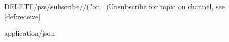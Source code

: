  
\begin{apiRoute}{DELETE}{/pss/subscribe//(?on=)}{Unsubscribe for topic on channel, see \ref{def:receive}}
{
}
{ }

\begin{routeParameter} 
\end{routeParameter}
\begin{queryParameter} 
\end{queryParameter} \begin{headerParameter} 
\end{headerParameter}
\begin{routeResponse}{application/json}
\end{routeResponse}
\end{apiRoute}

